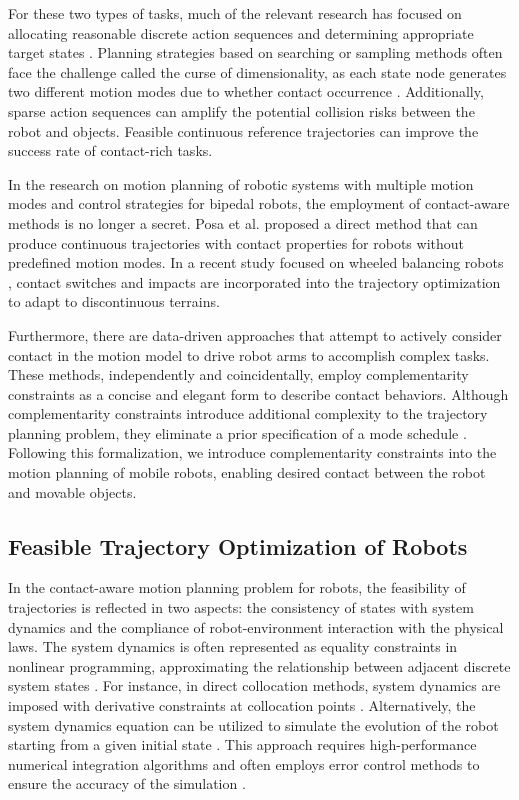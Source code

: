 For these two types of tasks, much of the relevant research has focused on allocating reasonable discrete action sequences and determining appropriate target states \cite{saxena2023planning,saxena2023mamo,levihn2013hierarchical}. Planning strategies based on searching or sampling methods often face the challenge called the curse of dimensionality, as each state node generates two different motion modes due to whether contact occurrence \cite{russ2023underactuated,posa2014direct}. Additionally, sparse action sequences can amplify the potential collision risks between the robot and objects. Feasible continuous reference trajectories can improve the success rate of contact-rich tasks. %

In the research on motion planning of robotic systems with multiple motion modes and control strategies for bipedal robots, the employment of contact-aware methods is no longer a secret. Posa et al. \cite{posa2014direct} proposed a direct method that can produce continuous trajectories with contact properties for robots without predefined motion modes. In a recent study focused on wheeled balancing robots \cite{vicotr2023nonsmoothcontact}, contact switches and impacts are incorporated into the trajectory optimization to adapt to discontinuous terrains. 

Furthermore, there are data-driven approaches \cite{bianchini2023simultaneous,sangwoon2022activeextrinsic,bauza2023tac2pose} that attempt to actively consider contact in the motion model to drive robot arms to accomplish complex tasks. These methods, independently and coincidentally, employ complementarity constraints as a concise and elegant form to describe contact behaviors. Although complementarity constraints introduce additional complexity to the trajectory planning problem, they eliminate a prior specification of a mode schedule \cite{posa2014direct}. Following this formalization, we introduce complementarity constraints into the motion planning of mobile robots, enabling desired contact between the robot and movable objects.

\subsection{Feasible Trajectory Optimization of Robots}
\label{sec-related_feasible_traj}
In the contact-aware motion planning problem for robots, the feasibility of trajectories is reflected in two aspects: the consistency of states with system dynamics and the compliance of robot-environment interaction with the physical laws. 
The system dynamics is often represented as equality constraints in nonlinear programming, approximating the relationship between adjacent discrete system states \cite{russ2023underactuated}. For instance, in direct collocation methods, system dynamics are imposed with derivative constraints at collocation points \cite{hargraves1987direct,kelly2017trajecotryopt}. Alternatively, the system dynamics equation can be utilized to simulate the evolution of the robot starting from a given initial state \cite{betts1998survey}. This approach requires high-performance numerical integration algorithms and often employs error control methods to ensure the accuracy of the simulation \cite{russ2023underactuated}.


